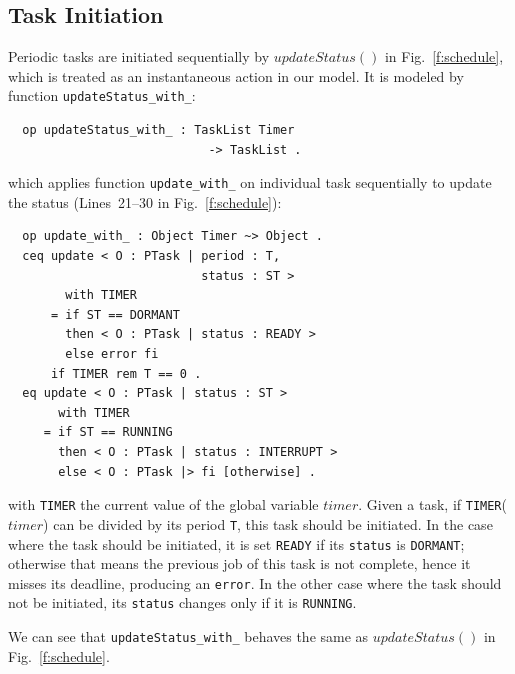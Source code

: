 \documentclass[12pt,onecolumn]{IEEEtranTIE}
\begin{document}
\subsection{Task Initiation}
\label{ss:init}
Periodic tasks are initiated sequentially by $\mathit{updateStatus()}$
in Fig.~\ref{f:schedule}, which is treated as an instantaneous action
in our model. It is modeled by function \verb|updateStatus_with_|:
\begin{verbatim}
  op updateStatus_with_ : TaskList Timer 
                            -> TaskList . 
\end{verbatim}
which applies function \verb|update_with_| on individual task
sequentially to update the status (Lines~21--30 in
Fig.~\ref{f:schedule}):
\begin{verbatim}
  op update_with_ : Object Timer ~> Object .
  ceq update < O : PTask | period : T, 
                           status : ST > 
        with TIMER
      = if ST == DORMANT 
        then < O : PTask | status : READY >
        else error fi
      if TIMER rem T == 0 .
  eq update < O : PTask | status : ST > 
       with TIMER
     = if ST == RUNNING 
       then < O : PTask | status : INTERRUPT >
       else < O : PTask |> fi [otherwise] .
\end{verbatim}
with \verb|TIMER| the current value of the global variable $\mathit{timer}$.
Given a task, if \verb|TIMER|($\mathit{timer}$) can be divided by its period
\verb|T|, this task should be initiated.  In the case where the task
should be initiated, it is set \verb|READY| if its \verb|status| is
\verb|DORMANT|; otherwise that means the previous job of this task is
not complete, hence it misses its deadline, producing an
\verb|error|. In the other case where the task should not be
initiated, its \verb|status| changes only if it is \verb|RUNNING|.

We can see that \verb|updateStatus_with_| behaves the same as
$\mathit{updateStatus()}$ in Fig.~\ref{f:schedule}.
\end{document}

